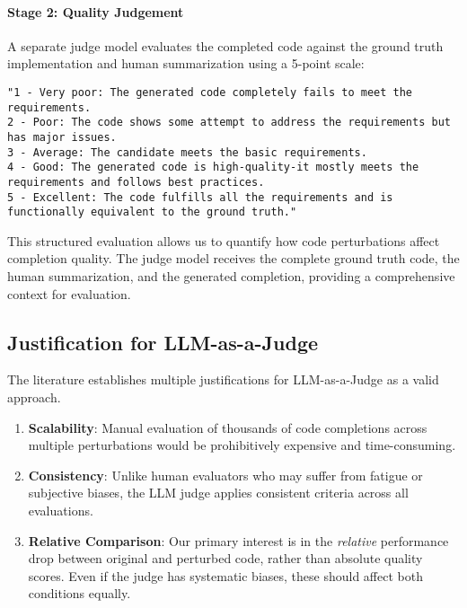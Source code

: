 \documentclass[%
thesis=student,%
coverpage=false,%
titlepage=false,%
headmarks=true, %
english,%
font=libertine, %
math=newpxtx, %
BCOR=5mm,%
coverBCOR=11mm%
]{tum-templates/book/tumbook}
\begin{document}
\paragraph{Stage 2: Quality Judgement}
A separate judge model evaluates the completed code against the ground truth implementation and human summarization using a 5-point scale:

\begin{lstlisting}[style=pythonstyle, caption={Prompt template for the judge model}]
"1 - Very poor: The generated code completely fails to meet the requirements.
2 - Poor: The code shows some attempt to address the requirements but has major issues.
3 - Average: The candidate meets the basic requirements.
4 - Good: The generated code is high-quality-it mostly meets the requirements and follows best practices.
5 - Excellent: The code fulfills all the requirements and is functionally equivalent to the ground truth."
\end{lstlisting}
This structured evaluation allows us to quantify how code perturbations affect completion quality. The judge model receives the complete ground truth code, the human summarization, and the generated completion, providing a comprehensive context for evaluation.

\subsection{Justification for LLM-as-a-Judge}

The literature establishes multiple justifications for LLM-as-a-Judge as a valid approach. 

\begin{enumerate}
\item \textbf{Scalability}: Manual evaluation of thousands of code completions across multiple perturbations would be prohibitively expensive and time-consuming.
\item \textbf{Consistency}: Unlike human evaluators who may suffer from fatigue or subjective biases, the LLM judge applies consistent criteria across all evaluations.

\item \textbf{Relative Comparison}: Our primary interest is in the \textit{relative} performance drop between original and perturbed code, rather than absolute quality scores. Even if the judge has systematic biases, these should affect both conditions equally.
\end{enumerate}
\end{document}
